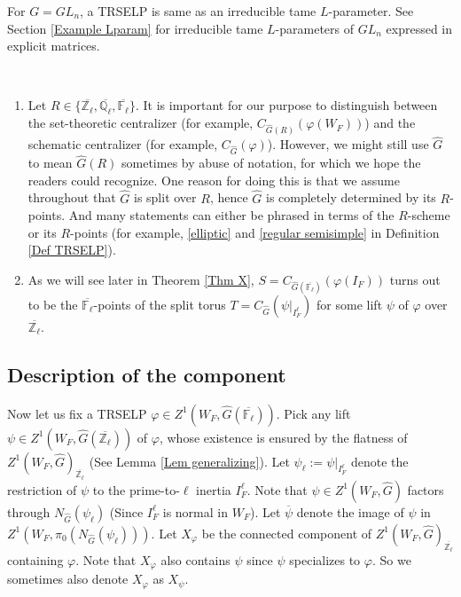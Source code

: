     \begin{eg}
    	For $G=GL_n$, a TRSELP is same as an irreducible tame $L$-parameter. See Section \ref{Example Lparam} for irreducible tame $L$-parameters of $GL_n$ expressed in explicit matrices.
    \end{eg}

  \begin{remark}\
  	\begin{enumerate}
  		\item Let $R \in \{\overline{\mathbb{Z}_{\ell}}, \overline{\mathbb{Q}_{\ell}}, \overline{\mathbb{F}_{\ell}}\}$. It is important for our purpose to distinguish between the set-theoretic centralizer (for example, $C_{\hat{G}(R)}(\varphi(W_F))$) and the schematic centralizer (for example, $C_{\hat{G}}(\varphi)$). However, we might still use $\hat{G}$ to mean $\hat{G}(R)$ sometimes by abuse of notation, for which we hope the readers could recognize. One reason for doing this is that we assume throughout that $\hat{G}$ is split over $R$, hence $\hat{G}$ is completely determined by its $R$-points. And many statements can either be phrased in terms of the $R$-scheme or its $R$-points (for example, \ref{elliptic} and \ref{regular semisimple} in Definition \ref{Def TRSELP}).
  		\item As we will see later in Theorem \ref{Thm X}, $S=C_{\hat{G}(\overline{\mathbb{F}_{\ell}})}(\varphi(I_F))$ turns out to be the $\overline{\mathbb{F}_{\ell}}$-points of the split torus $T=C_{\hat{G}}(\psi|_{I_F^{\ell}})$ for some lift $\psi$ of $\varphi$ over $\overline{\mathbb{Z}_{\ell}}$.
  	\end{enumerate}
  \end{remark}

\subsection{Description of the component}\label{Subsection the component}

Now let us fix a TRSELP $\varphi \in Z^1(W_F, \hat{G}(\overline{\mathbb{F}_{\ell}}))$. Pick any lift $\psi \in Z^1(W_F, \hat{G}(\overline{\mathbb{Z}_{\ell}}))$ of $\varphi$, whose existence is ensured by the flatness of $Z^1(W_F, \hat{G})_{\overline{\mathbb{Z}_{\ell}}}$ (See Lemma \ref{Lem generalizing}). Let $\psi_{\ell}:=\psi|_{I_F^{\ell}}$ denote the restriction of $\psi$ to the prime-to-$\ell$ inertia $I_F^{\ell}$. Note that $\psi \in Z^1(W_F, \hat{G})$ factors through $N_{\hat{G}}(\psi_{\ell})$ (Since $I_F^{\ell}$ is normal in $W_F$). Let $\overline{\psi}$ denote the image of $\psi$ in $Z^1(W_F, \pi_0(N_{\hat{G}}(\psi_{\ell})))$. Let $X_{\varphi}$ be the connected component of $Z^1(W_F, \hat{G})_{\overline{\mathbb{Z}_{\ell}}}$ containing $\varphi$. Note that $X_{\varphi}$ also contains $\psi$ since $\psi$ specializes to $\varphi$. So we sometimes also denote $X_{\varphi}$ as $X_{\psi}$.


